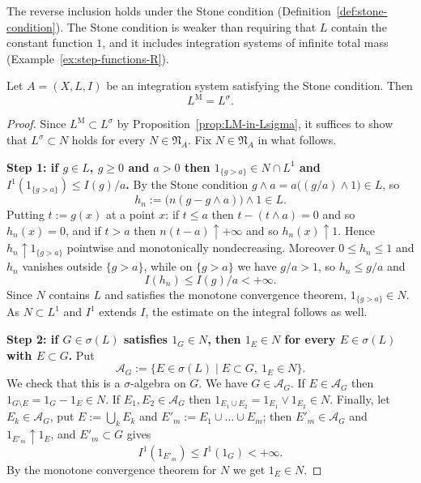 \noindent
The reverse inclusion holds under the Stone condition
(Definition~\ref{def:stone-condition}).
The Stone condition is weaker than requiring that $L$ contain the constant
function $1$, and it includes integration systems of infinite total mass
(Example~\ref{ex:step-functions-R}).

\begin{theorem}\label{thm:LM-equals-Lsigma}
  Let $A=(X,L,I)$ be an integration system satisfying the Stone condition. Then
  \[
    L^{\mathrm{M}}=L^{\sigma}.
  \]
\end{theorem}
\begin{proof}
  Since $L^{\mathrm{M}}\subset L^{\sigma}$ by
  Proposition~\ref{prop:LM-in-Lsigma}, it suffices to show that
  $L^{\sigma}\subset N$ holds for every $N\in\mathfrak{N}_A$.
  Fix $N\in\mathfrak{N}_A$ in what follows.

  \textbf{Step 1: if $g\in L$, $g\ge0$ and $a>0$ then
  $1_{\{g>a\}}\in N\cap L^1$ and $I^1(1_{\{g>a\}})\le I(g)/a$.}
  By the Stone condition $g\wedge a=a\bigl((g/a)\land1\bigr)\in L$, so
  \[
    h_n:=\bigl(n(g-g\land a)\bigr)\land1\in L .
  \]
  Putting $t:=g(x)$ at a point $x$: if $t\le a$ then $t-(t\land a)=0$ and so
  $h_n(x)=0$, and if $t>a$ then $n(t-a)\uparrow+\infty$ and so
  $h_n(x)\uparrow1$.
  Hence $h_n\uparrow1_{\{g>a\}}$ pointwise and monotonically nondecreasing.
  Moreover $0\le h_n\le1$ and $h_n$ vanishes outside $\{g>a\}$, while on
  $\{g>a\}$ we have $g/a>1$, so $h_n\le g/a$ and
  \[
    I(h_n)\le I(g)/a<+\infty.
  \]
  Since $N$ contains $L$ and satisfies the monotone convergence theorem,
  $1_{\{g>a\}}\in N$.
  As $N\subset L^1$ and $I^1$ extends $I$, the estimate on the integral follows
  as well.

  \textbf{Step 2: if $G\in\sigma(L)$ satisfies $1_G\in N$, then $1_E\in N$ for
  every $E\in\sigma(L)$ with $E\subset G$.}
  Put
  \[
    \mathcal{A}_G:=\{E\in\sigma(L)\mid E\subset G,\ 1_E\in N\} .
  \]
  We check that this is a $\sigma$-algebra on $G$.
  We have $G\in\mathcal{A}_G$. If $E\in\mathcal{A}_G$ then
  $1_{G\setminus E}=1_G-1_E\in N$.
  If $E_1,E_2\in\mathcal{A}_G$ then
  $1_{E_1\cup E_2}=1_{E_1}\lor1_{E_2}\in N$.
  Finally, let $E_k\in\mathcal{A}_G$, put $E:=\bigcup_kE_k$ and
  $E'_m:=E_1\cup\dots\cup E_m$; then $E'_m\in\mathcal{A}_G$ and
  $1_{E'_m}\uparrow1_E$, and $E'_m\subset G$ gives
  \[
    I^1(1_{E'_m})\le I^1(1_G)<+\infty .
  \]
  By the monotone convergence theorem for $N$ we get $1_E\in N$.


\end{proof}
